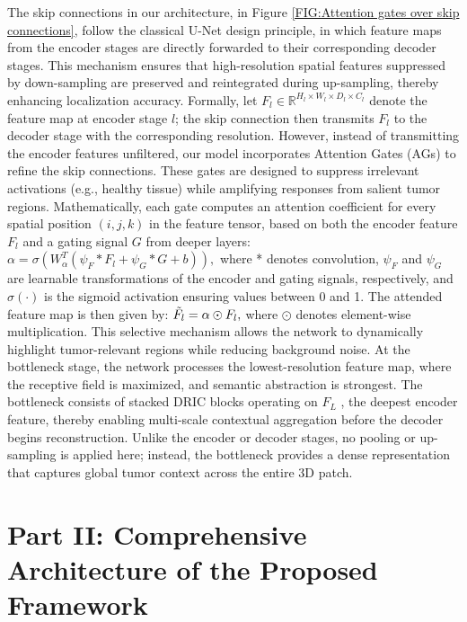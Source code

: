 \documentclass[a4paper,fleqn]{cas-dc}
\begin{document}
The skip connections in our architecture, in Figure \ref{FIG:Attention gates over skip connections}, follow the classical U-Net design principle, in which feature maps from the encoder stages are directly forwarded to their corresponding decoder stages. This mechanism ensures that high-resolution spatial features suppressed by down-sampling are preserved and reintegrated during up-sampling, thereby enhancing localization accuracy. Formally, let $F_l\in \mathbb{R}^{H_l\times W_l\times D_l\times C_l}$ denote the feature map at encoder stage $l$; the skip connection then transmits $F_l$ to the decoder stage with the corresponding resolution.
However, instead of transmitting the encoder features unfiltered, our model incorporates Attention Gates (AGs) to refine the skip connections. These gates are designed to suppress irrelevant activations (e.g., healthy tissue) while amplifying responses from salient tumor regions. Mathematically, each gate computes an attention coefficient for every spatial position $(i,j,k)$ in the feature tensor, based on both the encoder feature $F_l$ and a gating signal $G$ from deeper layers: $\alpha =\sigma (W_\alpha^T (\psi_F * F_l + \psi_G * G + b)),$ where * denotes convolution, $\psi_F$ and $\psi_G$ are learnable transformations of the encoder and gating signals, respectively, and $\sigma(\cdot)$ is the sigmoid activation ensuring values between 0 and 1. The attended feature map is then given by: $\Tilde{F}_l = \alpha \odot F_l,$ where $\odot$ denotes element-wise multiplication. This selective mechanism allows the network to dynamically highlight tumor-relevant regions while reducing background noise.
At the bottleneck stage, the network processes the lowest-resolution feature map, where the receptive field is maximized, and semantic abstraction is strongest. The bottleneck consists of stacked DRIC blocks operating on $F_L$ , the deepest encoder feature, thereby enabling multi-scale contextual aggregation before the decoder begins reconstruction. Unlike the encoder or decoder stages, no pooling or up-sampling is applied here; instead, the bottleneck provides a dense representation that captures global tumor context across the entire 3D patch.



\section*{Part II: Comprehensive Architecture of the Proposed Framework}
\end{document}
